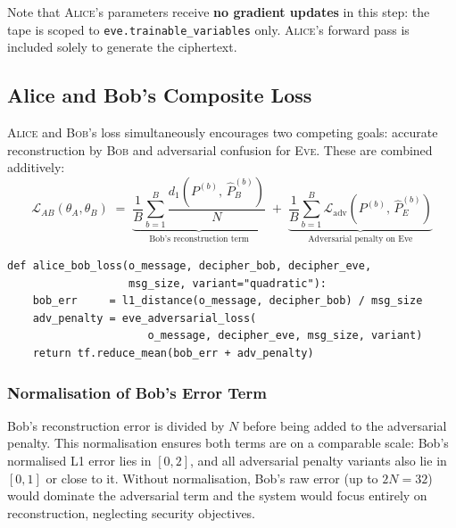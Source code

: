 \documentclass[12pt, a4paper]{article}
\newcommand{\alice}{\textsc{Alice}}
\newcommand{\bob}{\textsc{Bob}}
\newcommand{\eve}{\textsc{Eve}}
\newcommand{\thetaA}{\theta_{\!A}}
\newcommand{\thetaB}{\theta_{\!B}}
\newcommand{\code}[1]{\texttt{\color{CodeRed}#1}}
\begin{document}
Note that \alice{}'s parameters receive \textbf{no gradient updates} in
this step: the tape is scoped to \code{eve.trainable\_variables} only.
\alice{}'s forward pass is included solely to generate the ciphertext.

\subsection{Alice and Bob's Composite Loss}
\label{subsec:ab_loss}

\alice{} and \bob{}'s loss simultaneously encourages two competing goals:
accurate reconstruction by \bob{} and adversarial confusion for \eve{}.
These are combined additively:
%
\begin{equation}
  \mathcal{L}_{AB}(\thetaA, \thetaB)
  \;=\;
  \underbrace{
    \frac{1}{B}\sum_{b=1}^B
    \frac{d_1(P^{(b)},\, \hat{P}_B^{(b)})}{N}
  }_{\text{Bob's reconstruction term}}
  \;+\;
  \underbrace{
    \frac{1}{B}\sum_{b=1}^B
    \mathcal{L}_{\mathrm{adv}}(P^{(b)},\, \hat{P}_E^{(b)})
  }_{\text{Adversarial penalty on Eve}}
  \label{eq:ab_loss_full}
\end{equation}

\begin{lstlisting}[caption={Alice and Bob's composite loss function}]
def alice_bob_loss(o_message, decipher_bob, decipher_eve,
                   msg_size, variant="quadratic"):
    bob_err     = l1_distance(o_message, decipher_bob) / msg_size
    adv_penalty = eve_adversarial_loss(
                      o_message, decipher_eve, msg_size, variant)
    return tf.reduce_mean(bob_err + adv_penalty)
\end{lstlisting}

\subsubsection*{Normalisation of Bob's Error Term}

Bob's reconstruction error is divided by $N$ before being added to the
adversarial penalty. This normalisation ensures both terms are on a
comparable scale: Bob's normalised L1 error lies in $[0, 2]$, and all
adversarial penalty variants also lie in $[0, 1]$ or close to it.
Without normalisation, Bob's raw error (up to $2N = 32$) would dominate
the adversarial term and the system would focus entirely on reconstruction,
neglecting security objectives.
\end{document}

